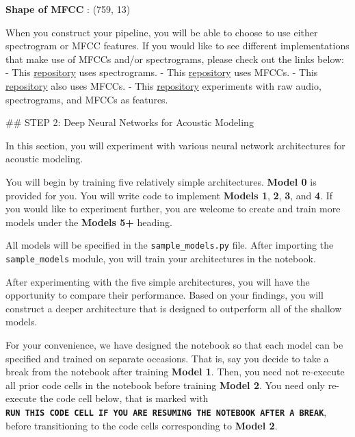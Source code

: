 \documentclass[11pt]{article}
\begin{document}
    \textbf{Shape of MFCC} : (759, 13)

    
    When you construct your pipeline, you will be able to choose to use
either spectrogram or MFCC features. If you would like to see different
implementations that make use of MFCCs and/or spectrograms, please check
out the links below: - This
\href{https://github.com/baidu-research/ba-dls-deepspeech}{repository}
uses spectrograms. - This
\href{https://github.com/mozilla/DeepSpeech}{repository} uses MFCCs. -
This
\href{https://github.com/buriburisuri/speech-to-text-wavenet}{repository}
also uses MFCCs. - This
\href{https://github.com/pannous/tensorflow-speech-recognition/blob/master/speech_data.py}{repository}
experiments with raw audio, spectrograms, and MFCCs as features.

     \#\# STEP 2: Deep Neural Networks for Acoustic Modeling

In this section, you will experiment with various neural network
architectures for acoustic modeling.

You will begin by training five relatively simple architectures.
\textbf{Model 0} is provided for you. You will write code to implement
\textbf{Models 1}, \textbf{2}, \textbf{3}, and \textbf{4}. If you would
like to experiment further, you are welcome to create and train more
models under the \textbf{Models 5+} heading.

All models will be specified in the \texttt{sample\_models.py} file.
After importing the \texttt{sample\_models} module, you will train your
architectures in the notebook.

After experimenting with the five simple architectures, you will have
the opportunity to compare their performance. Based on your findings,
you will construct a deeper architecture that is designed to outperform
all of the shallow models.

For your convenience, we have designed the notebook so that each model
can be specified and trained on separate occasions. That is, say you
decide to take a break from the notebook after training \textbf{Model
1}. Then, you need not re-execute all prior code cells in the notebook
before training \textbf{Model 2}. You need only re-execute the code cell
below, that is marked with
\textbf{\texttt{RUN\ THIS\ CODE\ CELL\ IF\ YOU\ ARE\ RESUMING\ THE\ NOTEBOOK\ AFTER\ A\ BREAK}},
before transitioning to the code cells corresponding to \textbf{Model
2}.
\end{document}
